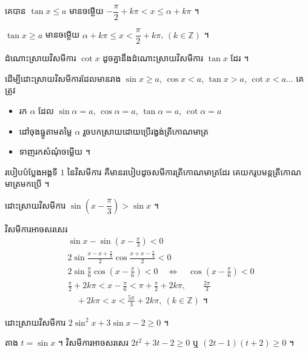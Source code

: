 \begin{formulaBox}[ជាទូទៅ]
គេបាន $\tan x \le a$ មានចម្លើយ $-\dfrac{\pi}{2} + k\pi < x \le \alpha + k\pi$ ។

$\tan x \ge a$ មានចម្លើយ $\alpha + k\pi \le x < \dfrac{\pi}{2} + k\pi$, $(k \in \mathbb{Z})$ ។
\end{formulaBox}

\begin{note}[សម្គាល់]
ដំណោះស្រាយវិសមីការ $\cot x$ ដូចគ្នានឹងដំណោះស្រាយវិសមីការ $\tan x$ ដែរ ។
\end{note}

\begin{formulaBox}[ជាទូទៅ]
ដើម្បីដោះស្រាយវិសមីការដែលមានរាង $\sin x \ge a$, $\cos x < a$, $\tan x > a$, $\cot x < a \ldots$ គេត្រូវ
\begin{itemize}
  \item រក $\alpha$ ដែល $\sin\alpha = a$, $\cos\alpha = a$, $\tan\alpha = a$, $\cot\alpha = a$
  \item ដៅចុងធ្នូតាមតម្លៃ $\alpha$ រួចបកស្រាយដោយប្រើរង្វង់ត្រីកោណមាត្រ
  \item ទាញរកសំណុំចម្លើយ ។
\end{itemize}
\end{formulaBox}

របៀបបំប្លែងអង្គទី $1$ នៃវិសមីការ គឺមានរបៀបដូចសមីការត្រីកោណមាត្រដែរ គេយករូបមន្តត្រីកោណមាត្រមកប្រើ ។

\begin{example}[លំហាត់គំរូ ៨]
ដោះស្រាយវិសមីការ $\sin\left(x - \dfrac{\pi}{3}\right) > \sin x$ ។
\end{example}
\ans
វិសមីការអាចសរសេរ
\[
\begin{aligned}
&\sin x - \sin\left(x - \frac{\pi}{3}\right) < 0\\
&2\sin\frac{x - x + \frac{\pi}{3}}{2}\cos\frac{x + x - \frac{\pi}{3}}{2} < 0\\
&2\sin\frac{\pi}{6}\cos\left(x - \frac{\pi}{6}\right) < 0 \quad \Leftrightarrow \quad \cos\left(x - \frac{\pi}{6}\right) < 0\\
&\frac{\pi}{2} + 2k\pi < x - \frac{\pi}{6} < \pi + \frac{\pi}{2} + 2k\pi, \qquad \frac{2\pi}{3}\\
&\quad + 2k\pi < x < \frac{5\pi}{3} + 2k\pi, \ (k \in \mathbb{Z}) \text{ ។}
\end{aligned}
\]

\begin{example}[លំហាត់គំរូ ៩]
ដោះស្រាយវិសមីការ $2\sin^2 x + 3\sin x - 2 \ge 0$ ។
\end{example}
\ans
តាង $t = \sin x$ ។ វិសមីការអាចសរសេរ $2t^2 + 3t - 2 \ge 0$ ឬ $(2t - 1)(t + 2) \ge 0$ ។

